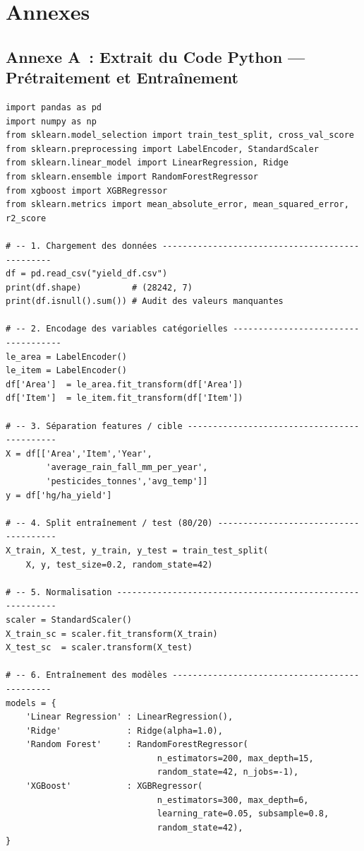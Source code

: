 \chapter{Annexes}

\section*{Annexe A~: Extrait du Code Python --- Prétraitement et Entraînement}

\begin{small}
\begin{verbatim}
import pandas as pd
import numpy as np
from sklearn.model_selection import train_test_split, cross_val_score
from sklearn.preprocessing import LabelEncoder, StandardScaler
from sklearn.linear_model import LinearRegression, Ridge
from sklearn.ensemble import RandomForestRegressor
from xgboost import XGBRegressor
from sklearn.metrics import mean_absolute_error, mean_squared_error, r2_score

# -- 1. Chargement des données ------------------------------------------------
df = pd.read_csv("yield_df.csv")
print(df.shape)          # (28242, 7)
print(df.isnull().sum()) # Audit des valeurs manquantes

# -- 2. Encodage des variables catégorielles ------------------------------------
le_area = LabelEncoder()
le_item = LabelEncoder()
df['Area']  = le_area.fit_transform(df['Area'])
df['Item']  = le_item.fit_transform(df['Item'])

# -- 3. Séparation features / cible --------------------------------------------
X = df[['Area','Item','Year',
        'average_rain_fall_mm_per_year',
        'pesticides_tonnes','avg_temp']]
y = df['hg/ha_yield']

# -- 4. Split entraînement / test (80/20) --------------------------------------
X_train, X_test, y_train, y_test = train_test_split(
    X, y, test_size=0.2, random_state=42)

# -- 5. Normalisation ----------------------------------------------------------
scaler = StandardScaler()
X_train_sc = scaler.fit_transform(X_train)
X_test_sc  = scaler.transform(X_test)

# -- 6. Entraînement des modèles ----------------------------------------------
models = {
    'Linear Regression' : LinearRegression(),
    'Ridge'             : Ridge(alpha=1.0),
    'Random Forest'     : RandomForestRegressor(
                              n_estimators=200, max_depth=15,
                              random_state=42, n_jobs=-1),
    'XGBoost'           : XGBRegressor(
                              n_estimators=300, max_depth=6,
                              learning_rate=0.05, subsample=0.8,
                              random_state=42),
}


\end{verbatim}
\end{small}
